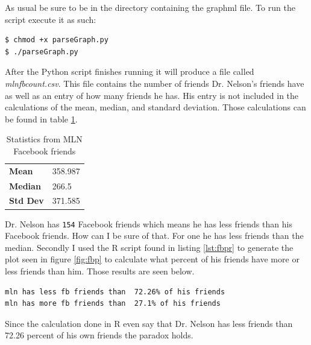 \documentclass[letterpaper,10pt]{article}
\begin{document}
As usual be sure to be in the directory containing the graphml file. 
To run the script execute it as such:
\begin{lstlisting}[frame=single]
$ chmod +x parseGraph.py
$ ./parseGraph.py
\end{lstlisting}

After the Python script finishes running it will produce a file called \emph{mlnfbcount.csv}. This file contains the number of friends Dr. Nelson's friends have as well as an entry of how many friends he has. His entry is not included in the calculations of the mean, median, and standard deviation. Those calculations can be found in table \ref{stats:fb}. 
\begin{table}
\centering
\begin{tabular}{ l l }
\textbf{Mean} & 358.987 \\
\textbf{Median} & 266.5 \\
\textbf{Std Dev} &  371.585 \\
\end{tabular}
\caption{Statistics from MLN Facebook friends}
\label{stats:fb}
\end{table}



Dr. Nelson has \verb+154+ Facebook friends which means he has less friends than his Facebook friends. How can I be sure of that. For one he has less friends than the median. Secondly I used the R script found in listing \ref{lst:fbpr}  to generate the plot seen in figure \ref{fig:fbp} to calculate what percent of his friends have more or less friends than him. Those results are seen below.
\begin{lstlisting}[frame=single]
mln has less fb friends than  72.26% of his friends
mln has more fb friends than  27.1% of his friends
\end{lstlisting}


Since the calculation done in R even say that Dr. Nelson has less friends than 72.26 percent of his own friends the paradox holds.


\newpage

\end{document}
